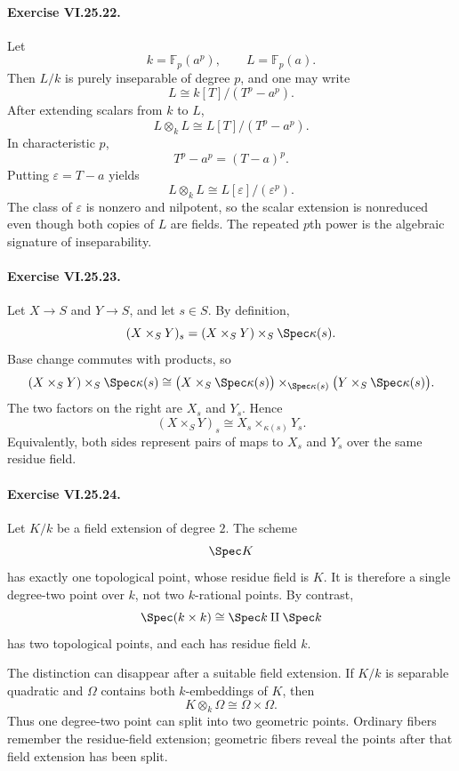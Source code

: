 \paragraph{Exercise VI.25.22.}
\begin{solution}
Let
\[
k=\mathbb F_p(a^p),\qquad L=\mathbb F_p(a).
\]
Then \(L/k\) is purely inseparable of degree \(p\), and one may write
\[
L\cong k[T]/(T^p-a^p).
\]
After extending scalars from \(k\) to \(L\),
\[
L\otimes_kL
\cong
L[T]/(T^p-a^p).
\]
In characteristic \(p\),
\[
T^p-a^p=(T-a)^p.
\]
Putting \(\varepsilon=T-a\) yields
\[
L\otimes_kL\cong L[\varepsilon]/(\varepsilon^p).
\]
The class of \(\varepsilon\) is nonzero and nilpotent, so the scalar extension is nonreduced even though both copies of \(L\) are fields.  The repeated \(p\)th power is the algebraic signature of inseparability.
\end{solution}

\paragraph{Exercise VI.25.23.}
\begin{solution}
Let \(X\to S\) and \(Y\to S\), and let \(s\in S\).  By definition,
\[
(X\times_SY)_s
=
(X\times_SY)\times_S\Spec\kappa(s).
\]
Base change commutes with products, so
\[
(X\times_SY)\times_S\Spec\kappa(s)
\cong
\bigl(X\times_S\Spec\kappa(s)\bigr)
\times_{\Spec\kappa(s)}
\bigl(Y\times_S\Spec\kappa(s)\bigr).
\]
The two factors on the right are \(X_s\) and \(Y_s\).  Hence
\[
\boxed{
(X\times_SY)_s
\cong
X_s\times_{\kappa(s)}Y_s
}.
\]
Equivalently, both sides represent pairs of maps to \(X_s\) and \(Y_s\) over the same residue field.
\end{solution}

\paragraph{Exercise VI.25.24.}
\begin{solution}
Let \(K/k\) be a field extension of degree \(2\).  The scheme
\[
\Spec K
\]
has exactly one topological point, whose residue field is \(K\).  It is therefore a single degree-two point over \(k\), not two \(k\)-rational points.  By contrast,
\[
\Spec(k\times k)\cong\Spec k\amalg\Spec k
\]
has two topological points, and each has residue field \(k\).

The distinction can disappear after a suitable field extension.  If \(K/k\) is separable quadratic and \(\Omega\) contains both \(k\)-embeddings of \(K\), then
\[
K\otimes_k\Omega\cong\Omega\times\Omega.
\]
Thus one degree-two point can split into two geometric points.  Ordinary fibers remember the residue-field extension; geometric fibers reveal the points after that field extension has been split.
\end{solution}

